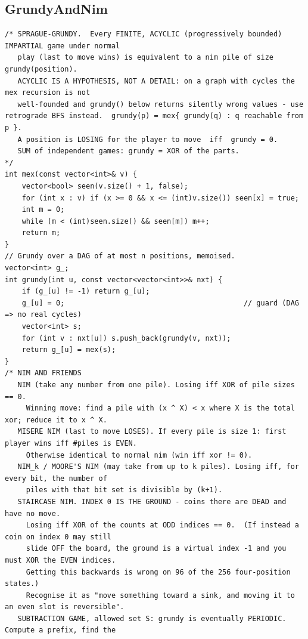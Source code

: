\documentclass[9pt,a4paper,twocolumn]{extarticle}
\begin{document}
\filbreak
\subsection{GrundyAndNim}
\nopagebreak
\begin{lstlisting}
/* SPRAGUE-GRUNDY.  Every FINITE, ACYCLIC (progressively bounded) IMPARTIAL game under normal
   play (last to move wins) is equivalent to a nim pile of size grundy(position).
   ACYCLIC IS A HYPOTHESIS, NOT A DETAIL: on a graph with cycles the mex recursion is not
   well-founded and grundy() below returns silently wrong values - use retrograde BFS instead.  grundy(p) = mex{ grundy(q) : q reachable from p }.
   A position is LOSING for the player to move  iff  grundy = 0.
   SUM of independent games: grundy = XOR of the parts.                                    */
int mex(const vector<int>& v) {
    vector<bool> seen(v.size() + 1, false);
    for (int x : v) if (x >= 0 && x <= (int)v.size()) seen[x] = true;
    int m = 0;
    while (m < (int)seen.size() && seen[m]) m++;
    return m;
}
// Grundy over a DAG of at most n positions, memoised.
vector<int> g_;
int grundy(int u, const vector<vector<int>>& nxt) {
    if (g_[u] != -1) return g_[u];
    g_[u] = 0;                                          // guard (DAG => no real cycles)
    vector<int> s;
    for (int v : nxt[u]) s.push_back(grundy(v, nxt));
    return g_[u] = mex(s);
}
/* NIM AND FRIENDS
   NIM (take any number from one pile). Losing iff XOR of pile sizes == 0.
     Winning move: find a pile with (x ^ X) < x where X is the total xor; reduce it to x ^ X.
   MISERE NIM (last to move LOSES). If every pile is size 1: first player wins iff #piles is EVEN.
     Otherwise identical to normal nim (win iff xor != 0).
   NIM_k / MOORE'S NIM (may take from up to k piles). Losing iff, for every bit, the number of
     piles with that bit set is divisible by (k+1).
   STAIRCASE NIM. INDEX 0 IS THE GROUND - coins there are DEAD and have no move.
     Losing iff XOR of the counts at ODD indices == 0.  (If instead a coin on index 0 may still
     slide OFF the board, the ground is a virtual index -1 and you must XOR the EVEN indices.
     Getting this backwards is wrong on 96 of the 256 four-position states.)
     Recognise it as "move something toward a sink, and moving it to an even slot is reversible".
   SUBTRACTION GAME, allowed set S: grundy is eventually PERIODIC. Compute a prefix, find the

\end{lstlisting}
\end{document}
